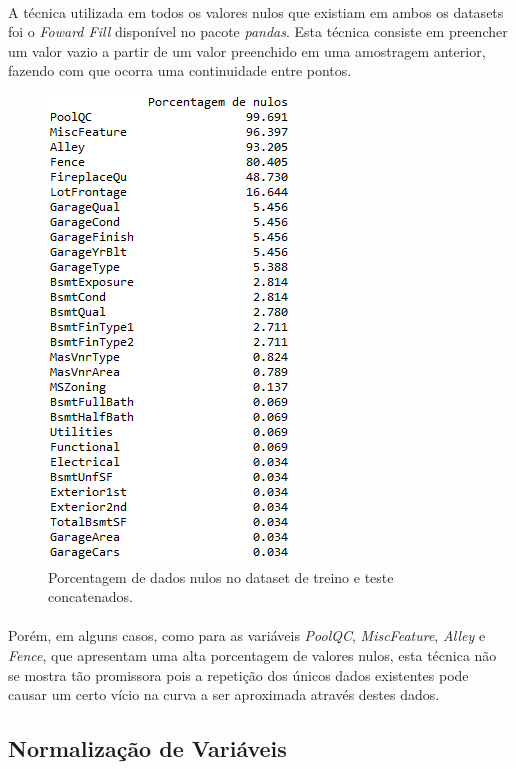 \documentclass{article}
\begin{document}
			\paragraph{}A técnica utilizada em todos os valores nulos que existiam em ambos os datasets foi o \textit{Foward Fill} disponível no pacote \textit{pandas}. Esta técnica consiste em preencher um valor vazio a partir de um valor preenchido em uma amostragem anterior, fazendo com que ocorra uma continuidade entre pontos. 
		
			\begin{figure}[H]
				\centering
				\includegraphics[scale=0.9]{../img/null_data}
				\caption{Porcentagem de dados nulos no dataset de treino e teste concatenados.}
			\end{figure}
		
			\paragraph{}Porém, em alguns casos, como para as variáveis \textit{PoolQC}, \textit{MiscFeature}, \textit{Alley} e \textit{Fence}, que apresentam uma alta porcentagem de valores nulos, esta técnica não se mostra tão promissora pois a repetição dos únicos dados existentes pode causar um certo vício na curva a ser aproximada através destes dados.
		
		\subsection{Normalização de Variáveis}
\end{document}
